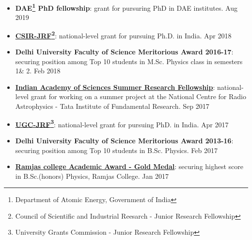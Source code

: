 \begin{itemize}
\item {\bf DAE\footnote{Department of Atomic Energy, Government of India} PhD fellowship}: grant for pursuring PhD in DAE institutes. \hfill{Aug 2019}
\item {\bf \href{https://drive.google.com/file/d/1yD3l3BYx1qn9Tvw0kq3EuNgfH1H4leNo/view?usp=sharing}{CSIR-JRF\footnote{Council of Scientific and Industrial Reesarch - Junior Research Fellowship}}}: national-level grant for pursuing Ph.D. in India. \hfill{Apr 2018}
\item {\bf Delhi University Faculty of Science Meritorious Award 2016-17}: securing position among Top 10 students in M.Sc. Physics class in semesters 1\& 2. \hfill{Feb 2018}
\item {\bf \href{https://drive.google.com/file/d/1DNbjEN0h9-dH9aIKz8tkRyhW-5-YZbuX/view?usp=sharing}{Indian Academy of Sciences Summer Research Fellowship}}: national-level grant for working on a summer project at the National Centre for Radio Astrophysics - Tata Institute of Fundamental Research. \hfill{Sep 2017}
\item {\bf \href{https://drive.google.com/file/d/1FsXbm19ESBOyAwlxNG1YaapSN36eSof4/view?usp=sharing}{UGC-JRF\footnote{University Grants Commission - Junior Research Fellowship}}}: national-level grant for pursuing PhD. in India. \hfill{Apr 2017}
\item {\bf Delhi University Faculty of Science Meritorious Award 2013-16}: securing position among Top 10 students in B.Sc. Physics. \hfill{Feb 2017}
\item {\bf \href{https://drive.google.com/file/d/11SpCxjvchaB6yPGz7WWUCJexzYfguccP/view?usp=sharing}{Ramjas college Academic Award - Gold Medal}}: securing highest score in B.Sc.(honors) Physics, Ramjas College. \hfill{Jan 2017}
\end{itemize}
